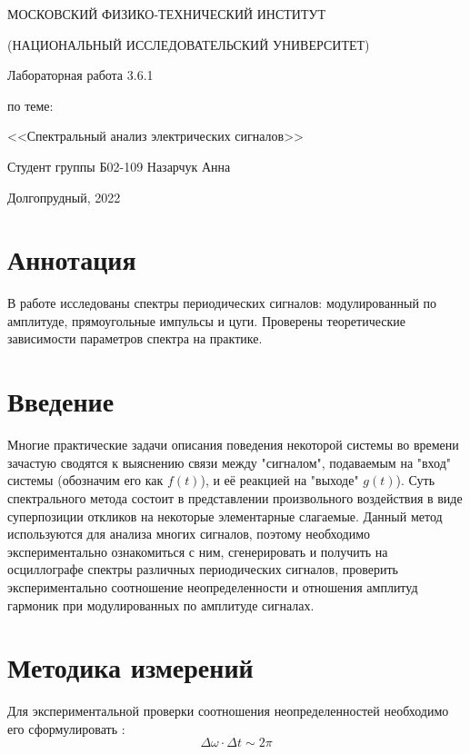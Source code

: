 \documentclass[a4paper,12pt]{article} %
\begin{document}
\begin{titlepage}

\thispagestyle{empty}

\centerline{МОСКОВСКИЙ ФИЗИКО-ТЕХНИЧЕСКИЙ ИНСТИТУТ}
\centerline{(НАЦИОНАЛЬНЫЙ ИССЛЕДОВАТЕЛЬСКИЙ УНИВЕРСИТЕТ)}

\vfill

\centerline{\huge{Лабораторная работа 3.6.1}}
\centerline{\large{по теме:}}
\centerline{\LARGE{<<Спектральный анализ электрических сигналов>>}}

\vfill

Студент группы Б02-109 \hfill Назарчук Анна

\vfill

\centerline{Долгопрудный, 2022}
\clearpage
\end{titlepage} 
\section{Аннотация}
В работе исследованы спектры периодических сигналов: модулированный по амплитуде, прямоугольные импульсы и цуги. Проверены теоретические зависимости параметров спектра на практике.


\section{Введение}
Многие практические задачи описания поведения некоторой системы во времени зачастую сводятся к выяснению связи между "сигналом", подаваемым на "вход"
системы (обозначим его как $f(t)$), и её реакцией на "выходе" $g(t)$). Суть спектрального метода состоит в представлении произвольного воздействия в виде суперпозиции откликов на некоторые элементарные слагаемые. Данный метод используются для анализа многих сигналов, поэтому необходимо экспериментально ознакомиться с ним, сгенерировать и получить на осциллографе спектры различных периодических сигналов, проверить экспериментально соотношение неопределенности и отношения амплитуд гармоник при модулированных по амплитуде сигналах.

\section{Методика измерений}
Для экспериментальной проверки соотношения неопределенностей необходимо его сформулировать \cite{labnik}:
\begin{equation}
\Delta \omega \cdot \Delta t \sim 2\pi
\end{equation}
\end{document}
